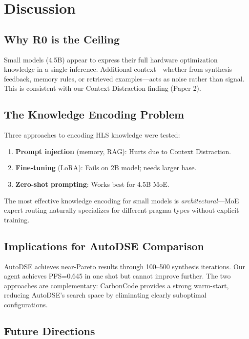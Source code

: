 \documentclass[conference]{IEEEtran}
\begin{document}
\section{Discussion}

\subsection{Why R0 is the Ceiling}

Small models (4.5B) appear to express their full hardware optimization
knowledge in a single inference. Additional context---whether from
synthesis feedback, memory rules, or retrieved examples---acts as
noise rather than signal. This is consistent with our Context
Distraction finding (Paper 2).

\subsection{The Knowledge Encoding Problem}

Three approaches to encoding HLS knowledge were tested:
\begin{enumerate}
    \item \textbf{Prompt injection} (memory, RAG): Hurts due to
    Context Distraction.
    \item \textbf{Fine-tuning} (LoRA): Fails on 2B model; needs
    larger base.
    \item \textbf{Zero-shot prompting}: Works best for 4.5B MoE.
\end{enumerate}

The most effective knowledge encoding for small models is
\emph{architectural}---MoE expert routing naturally specializes
for different pragma types without explicit training.

\subsection{Implications for AutoDSE Comparison}

AutoDSE achieves near-Pareto results through 100--500 synthesis
iterations. Our agent achieves PFS=0.645 in one shot but cannot
improve further. The two approaches are complementary:
CarbonCode provides a strong warm-start, reducing AutoDSE's
search space by eliminating clearly suboptimal configurations.

\subsection{Future Directions}
\end{document}
